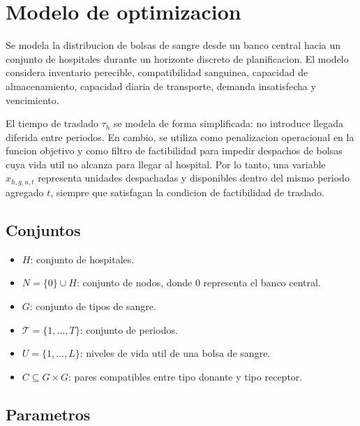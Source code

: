 \section{Modelo de optimizacion}

Se modela la distribucion de bolsas de sangre desde un banco central hacia un conjunto de hospitales durante un horizonte discreto de planificacion. El modelo considera inventario perecible, compatibilidad sanguinea, capacidad de almacenamiento, capacidad diaria de transporte, demanda insatisfecha y vencimiento.

El tiempo de traslado $\tau_h$ se modela de forma simplificada: no introduce llegada diferida entre periodos. En cambio, se utiliza como penalizacion operacional en la funcion objetivo y como filtro de factibilidad para impedir despachos de bolsas cuya vida util no alcanza para llegar al hospital. Por lo tanto, una variable $x_{h,g,u,t}$ representa unidades despachadas y disponibles dentro del mismo periodo agregado $t$, siempre que satisfagan la condicion de factibilidad de traslado.

\subsection{Conjuntos}

\begin{itemize}
    \item $H$: conjunto de hospitales.
    \item $N = \{0\} \cup H$: conjunto de nodos, donde $0$ representa el banco central.
    \item $G$: conjunto de tipos de sangre.
    \item $\mathcal{T} = \{1,\dots,T\}$: conjunto de periodos.
    \item $U = \{1,\dots,L\}$: niveles de vida util de una bolsa de sangre.
    \item $C \subseteq G \times G$: pares compatibles entre tipo donante y tipo receptor.
\end{itemize}

\subsection{Parametros}

